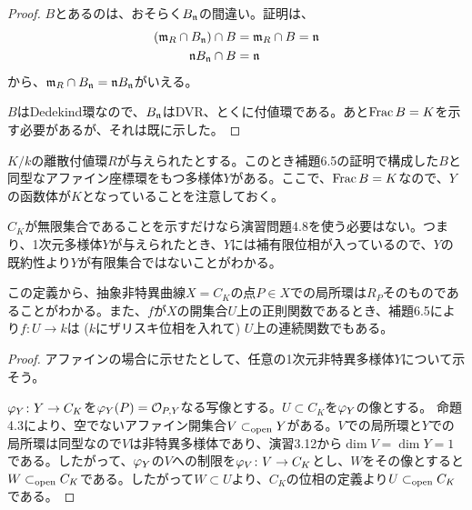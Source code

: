 \begin{proof}
   $B$とあるのは、おそらく$B_{\mathfrak{n}}$の間違い。証明は、
  \begin{align*}
    (\mathfrak{m}_R \cap B_{\mathfrak{n}}) \cap B &= \mathfrak{m}_R \cap B = \mathfrak{n} \\
    \mathfrak{n} B_{\mathfrak{n}} \cap B &= \mathfrak{n}
  \end{align*}
  から、$\mathfrak{m}_R \cap B_{\mathfrak{n}} = \mathfrak{n} B_{\mathfrak{n}}$がいえる。

  $B$はDedekind環なので、$B_{\mathfrak{n}}$はDVR、とくに付値環である。あと$\operatorname{Frac} B = K$を示す必要があるが、それは既に示した。
\end{proof}

\begin{rem}
  $K/k$の離散付値環$R$が与えられたとする。このとき補題6.5の証明で構成した$B$と同型なアファイン座標環をもつ多様体$Y$がある。ここで、$\operatorname{Frac} B = K$なので、$Y$の函数体が$K$となっていることを注意しておく。
\end{rem}


\begin{rem}
  $C_K$が無限集合であることを示すだけなら演習問題4.8を使う必要はない。つまり、1次元多様体$Y$が与えられたとき、$Y$には補有限位相が入っているので、$Y$の既約性より$Y$が有限集合ではないことがわかる。
\end{rem}


\begin{rem}
  この定義から、抽象非特異曲線$X = C_K$の点$P \in X$での局所環は$R_P$そのものであることがわかる。また、$f$が$X$の開集合$U$上の正則関数であるとき、補題6.5により$f \colon U \to k$は ($k$にザリスキ位相を入れて) $U$上の連続関数でもある。
\end{rem}



\begin{proof}
  アファインの場合に示せたとして、任意の1次元非特異多様体$Y$について示そう。

  ${\varphi}_Y \colon Y \to C_K$を${\varphi}_Y(P) = \mathcal{O}_{P,Y}$なる写像とする。$U \subset C_K$を${\varphi}_Y$の像とする。
  命題4.3により、空でないアファイン開集合$V \subset_{\text{open}} Y$がある。$V$での局所環と$Y$での局所環は同型なので$V$は非特異多様体であり、演習3.12から$\dim V = \dim Y = 1$である。したがって、${\varphi}_Y$の$V$への制限を${\varphi}_V \colon V \to C_K$とし、$W$をその像とすると$W \subset_{\text{open}} C_K$である。したがって$W \subset U$より、$C_K$の位相の定義より$U \subset_{\text{open}} C_K$である。
\end{proof}




